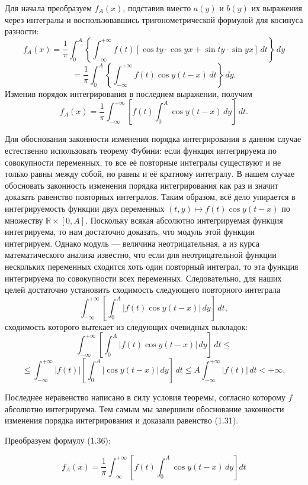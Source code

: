 {Для начала преобразуем \( f_A(x) \), подставив вместо \( a(y) \) и \( b(y) \) их выражения через интегралы и воспользовавшись тригонометрической формулой для косинуса разности:
\[
f_A(x) = \frac{1}{\pi} \int_0^A \left\{ \int_{-\infty}^{+\infty} f(t) [\cos ty \cdot \cos yx + \sin ty \cdot \sin yx] \, dt \right\} \, dy
\]
\[
= \frac{1}{\pi} \int_0^A \left\{ \int_{-\infty}^{+\infty} f(t) \cos y(t - x) \, dt \right\} \, dy. \tag{1.33}
\]
Изменив порядок интегрирования в последнем выражении, получим
\[
f_A(x) = \frac{1}{\pi} \int_{-\infty}^{+\infty} \left[ f(t) \int_0^A \cos y(t - x) \, dy \right] \, dt. \tag{1.34}
\]

Для обоснования законности изменения порядка интегрирования в данном случае естественно использовать теорему Фубини: если функция интегрируема по совокупности переменных, то все её повторные интегралы существуют и не только равны между собой, но равны и её кратному интегралу. В нашем случае обосновать законность изменения порядка интегрирования как раз и значит доказать равенство повторных интегралов. Таким образом, всё дело упирается в интегрируемость функции двух переменных \((t, y) \mapsto f(t) \cos y(t - x)\) по множеству \(\mathbb{R} \times [0, A]\). Поскольку всякая абсолютно интегрируемая функция интегрируема, то нам достаточно доказать, что модуль этой функции интегрируем. Однако модуль — величина неотрицательная, а из курса математического анализа известно, что если для неотрицательной функции нескольких переменных сходится хоть один повторный интеграл, то эта функция интегрируема по совокупности всех переменных. Следовательно, для наших целей достаточно установить сходимость следующего повторного интеграла
\[
\int_{-\infty}^{+\infty} \left[ \int_0^A |f(t) \cos y(t - x)| \, dy \right] \, dt, \tag{1.35}
\]
сходимость которого вытекает из следующих очевидных выкладок:
\[
\int_{-\infty}^{+\infty} \left[ \int_0^A |f(t) \cos y(t - x)| \, dy \right] \, dt \leq
\]
\[
\leq \int_{-\infty}^{+\infty} |f(t)| \left[ \int_0^A |\cos y(t - x)| \, dy \right] \, dt \leq A \int_{-\infty}^{+\infty} |f(t)| \, dt < +\infty, \tag{1.36}
\]


Последнее неравенство написано в силу условия теоремы, согласно которому \( f \) абсолютно интегрируема. Тем самым мы завершили обоснование законности изменения порядка интегрирования и доказали равенство (1.31).

Преобразуем формулу (1.36):

\[
f_A(x) = \frac{1}{\pi} \int_{-\infty}^{+\infty} \left[ f(t) \int_0^A \cos y(t-x) \, dy \right] dt
\]

}
